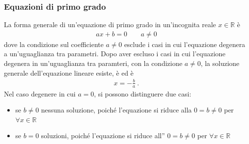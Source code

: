 \documentclass[letterpaper,10pt,italian]{jupyterBook}
\begin{document}
\subsubsection{Equazioni di primo grado}
\label{\detokenize{ch/algebra/real-algebra:equazioni-di-primo-grado}}\label{\detokenize{ch/algebra/real-algebra:math-hs-algebra-real-eq-first}}
\sphinxAtStartPar
La forma generale di un’equazione di primo grado in un’incognita reale \(x \in \mathbb{R}\) è
\begin{equation*}
\begin{split}a x + b = 0 \qquad a \ne 0 \end{split}
\end{equation*}
\sphinxAtStartPar
dove la condizione sul coefficiente \(a \ne 0\) esclude i casi in cui l’equazione degenera a un’uguaglianza tra parametri.
Dopo aver escluso i casi in cui l’equazione degenera in un’uguaglianza tra paramteri, con la condizione \(a \ne 0\), la soluzione generale dell’equazione lineare esiste, è  ed è
\begin{equation*}
\begin{split}x = - \frac{b}{a} \ .\end{split}
\end{equation*}
\sphinxAtStartPar
Nel caso degenere in cui \(a = 0\), si possono distinguere due casi:
\begin{itemize}
\item {} 
\sphinxAtStartPar
se \(b \ne 0\)  nessuna soluzione, poiché l’equazione si riduce alla {\hyperref[\detokenize{ch/logics:logics-identity}]{}} \(0 = b \ne 0\) per \(\forall x \in \mathbb{R}\)

\item {} 
\sphinxAtStartPar
se \(b = 0\)  soluzioni, poiché l’equazione si riduce all”{\hyperref[\detokenize{ch/logics:logics-contradiction}]{}} \(0 = b \ne 0\) per \(\forall x \in \mathbb{R}\)

\end{itemize}
\end{document}
